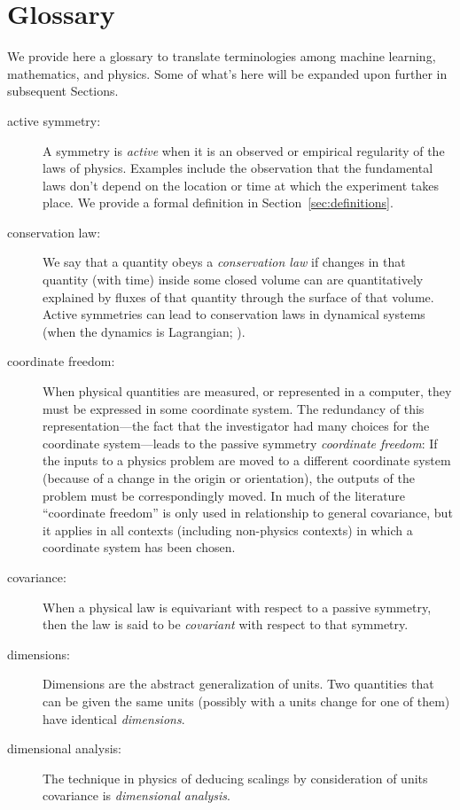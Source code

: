\documentclass{article} %
\newcommand{\sectionname}{Section}
\newcommand{\secref}[1]{\sectionname~\ref{#1}}
\begin{document}
\section{Glossary}\label{sec:glossary}
We provide here a glossary to translate terminologies among machine learning, mathematics, and physics.
Some of what's here will be expanded upon further in subsequent Sections.
\begin{description}
\item[active symmetry:]
  A symmetry is \emph{active} when it is an observed or empirical regularity of the laws of physics.
  Examples include the observation that the fundamental laws don't depend on the location or time at which the experiment takes place.
  We provide a formal definition in \secref{sec:definitions}.
\item[conservation law:]
  We say that a quantity obeys a \emph{conservation law} if changes in that quantity (with time) inside some closed volume can are quantitatively explained by fluxes of that quantity through the surface of that volume.
  Active symmetries can lead to conservation laws in dynamical systems (when the dynamics is Lagrangian; \citealt{noether}).
\item[coordinate freedom:]
  When physical quantities are measured, or represented in a computer, they must be expressed in some coordinate system.
  The redundancy of this representation---the fact that the investigator had many choices for the coordinate system---leads to the passive symmetry \emph{coordinate freedom}:
  If the inputs to a physics problem are moved to a different coordinate system (because of a change in the origin or orientation), the outputs of the problem must be correspondingly moved.
  In much of the literature ``coordinate freedom'' is only used in relationship to general covariance, but it applies in all contexts (including non-physics contexts) in which a coordinate system has been chosen.
\item[covariance:]
  When a physical law is equivariant with respect to a passive symmetry, then the law is said to be \emph{covariant} with respect to that symmetry.
\item[dimensions:]
  Dimensions are the abstract generalization of units.
  Two quantities that can be given the same units (possibly with a units change for one of them) have identical \emph{dimensions}.
\item[dimensional analysis:]
  The technique in physics of deducing scalings by consideration of units covariance is \emph{dimensional analysis}.

\end{description}
\end{document}
